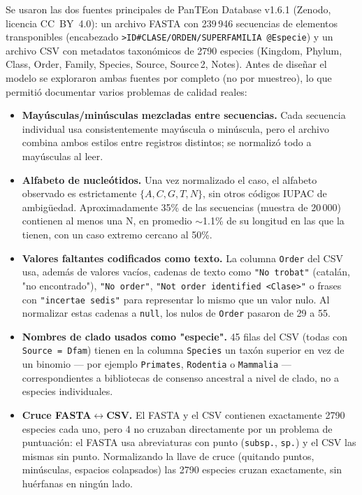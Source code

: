 \documentclass[pdflatex,sn-vancouver-num,lineno,referee]{sn-jnl}
\begin{document}
Se usaron las dos fuentes principales de PanTEon Database v1.6.1 (Zenodo,
licencia CC~BY~4.0): un archivo FASTA con 239\,946 secuencias de elementos
transponibles (encabezado \texttt{>ID\#CLASE/ORDEN/SUPERFAMILIA\ @Especie}) y un
archivo CSV con metadatos taxonómicos de 2790 especies (Kingdom, Phylum, Class,
Order, Family, Species, Source, Source\,2, Notes). Antes de diseñar el modelo
se exploraron ambas fuentes por completo (no por muestreo), lo que permitió
documentar varios problemas de calidad reales:

\begin{itemize}
  \item \textbf{Mayúsculas/minúsculas mezcladas entre secuencias.} Cada
  secuencia individual usa consistentemente mayúscula o minúscula, pero el
  archivo combina ambos estilos entre registros distintos; se normalizó todo a
  mayúsculas al leer.
  \item \textbf{Alfabeto de nucleótidos.} Una vez normalizado el caso, el
  alfabeto observado es estrictamente $\{A,C,G,T,N\}$, sin otros códigos IUPAC
  de ambigüedad. Aproximadamente 35\% de las secuencias (muestra de 20\,000)
  contienen al menos una N, en promedio $\sim$1.1\% de su longitud en las que
  la tienen, con un caso extremo cercano al 50\%.
  \item \textbf{Valores faltantes codificados como texto.} La columna
  \texttt{Order} del CSV usa, además de valores vacíos, cadenas de texto como
  \texttt{"No trobat"} (catalán, "no encontrado"), \texttt{"No order"},
  \texttt{"Not order identified <Clase>"} o frases con \texttt{"incertae
  sedis"} para representar lo mismo que un valor nulo. Al normalizar estas
  cadenas a \texttt{null}, los nulos de \texttt{Order} pasaron de 29 a 55.
  \item \textbf{Nombres de clado usados como "especie".} 45 filas del CSV
  (todas con \texttt{Source\,=\,Dfam}) tienen en la columna \texttt{Species} un
  taxón superior en vez de un binomio --- por ejemplo \texttt{Primates},
  \texttt{Rodentia} o \texttt{Mammalia} --- correspondientes a bibliotecas de
  consenso ancestral a nivel de clado, no a especies individuales.
  \item \textbf{Cruce FASTA$\leftrightarrow$CSV.} El FASTA y el CSV contienen
  exactamente 2790 especies cada uno, pero 4 no cruzaban directamente por un
  problema de puntuación: el FASTA usa abreviaturas con punto
  (\texttt{subsp.}, \texttt{sp.}) y el CSV las mismas sin punto. Normalizando
  la llave de cruce (quitando puntos, minúsculas, espacios colapsados) las
  2790 especies cruzan exactamente, sin huérfanas en ningún lado.
\end{itemize}
\end{document}

